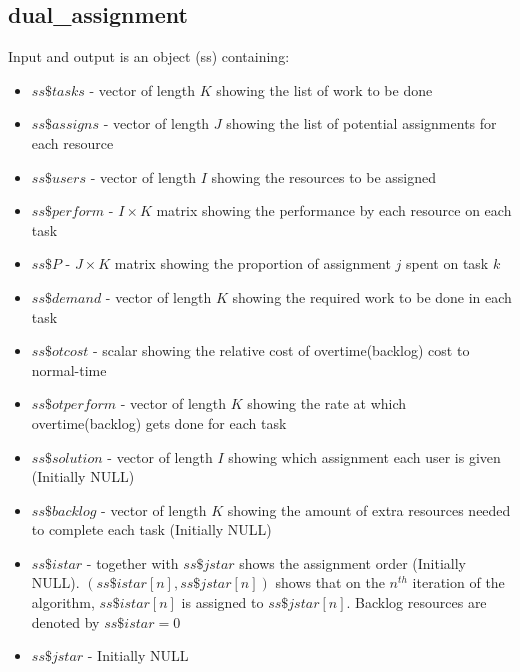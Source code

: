 \documentclass[12pt]{article}
\begin{document}
\subsection{dual\_assignment}
Input and output is an object (ss) containing:
\begin{itemize}
\item $ss\$tasks$ - vector of length $K$ showing the list of work to be done
\item $ss\$assigns$ - vector of length $J$ showing the list of potential assignments for each resource
\item $ss\$users$ - vector of length $I$ showing the resources to be assigned
\item $ss\$perform$ - $I \times K$ matrix showing the performance by each resource on each task
\item $ss\$P$ - $J \times K$ matrix showing the proportion of assignment $j$ spent on task $k$
\item $ss\$demand$ - vector of length $K$ showing the required work to be done in each task
\item $ss\$otcost$ - scalar showing the relative cost of overtime(backlog) cost to normal-time
\item $ss\$otperform$ - vector of length $K$ showing the rate at which overtime(backlog) gets done for each task
\item $ss\$solution$ - vector of length $I$ showing which assignment each user is given (Initially NULL)
\item $ss\$backlog$ - vector of length $K$ showing the amount of extra resources needed to complete each task (Initially NULL)
\item $ss\$istar$ - together with $ss\$jstar$ shows the assignment order (Initially NULL). $(ss\$istar[n],ss\$jstar[n])$ shows that on the $n^{th}$ iteration of the algorithm, $ss\$istar[n]$ is assigned to $ss\$jstar[n]$. Backlog resources are denoted by $ss\$istar=0$
\item $ss\$jstar$ - Initially NULL
\end{itemize}
\end{document}

